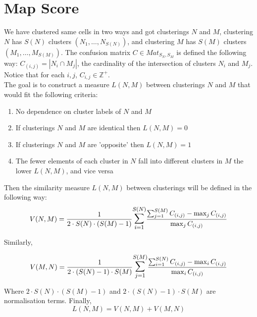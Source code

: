 \documentclass{article}
\begin{document}
\section{Map Score}
We have clustered same cells in two ways and got clusterings $N$ and $M$, clustering $N$ has $S(N)$ clusters $(N_1, \ldots, N_{S(N)})$, and clustering $M$ has $S(M)$ clusters $(M_1,\ldots,M_{S(M)})$. The confusion matrix $C\in Mat_{S_N,S_M}$ is defined the following way: $C_{(i,j)} = |N_i \cap M_j|$, the cardinality of the intersection of clusters $N_i$ and $M_j$. Notice that for each $i,j$, $C_{i,j} \in \mathbb{Z^+}$.\\

The goal is to construct a measure $L(N,M)$ between clusterings $N$ and $M$ that would fit the following criteria: 
\begin{enumerate}
    \item No dependence on cluster labels of $N$ and $M$
    \item If clusterings $N$ and $M$ are identical then $L(N,M) = 0$
    \item If clusterings $N$ and $M$ are 'opposite' then $L(N,M) = 1$
    \item The fewer elements of each cluster in $N$ fall into different clusters in $M$ the lower $L(N,M)$, and vice versa
\end{enumerate}

Then the  similarity measure $L(N,M)$ between clusterings will be defined in the following way: 
\[
V(N,M)= \frac{1}{2 \cdot S(N)\cdot (S(M)-1)} \mathlarger{\mathlarger{\sum}}_{i = 1}^{S(N)} \frac{ \sum_{j=1}^{S(M)} C_{(i,j)} - \max_j C_{(i, j)} }{  \max_j C_{(i, j)} }
\]

Similarly,

\[
V(M,N) = \frac{1}{2 \cdot (S(N)-1)\cdot S(M)} \mathlarger{\mathlarger{\sum}}_{j=1}^{S(M)} \frac{ \sum_{i=1}^{S(N)} C_{(i,j)} - \max_i C_{(i,j)} }{ \max_i C_{(i,j)} }
\]

Where $2 \cdot S(N) \cdot (S(M)-1)$ and $2 \cdot (S(N)-1)\cdot S(M)$ are normalisation terms. Finally, 
$$
L(N,M) = V(N,M) + V(M,N)
$$
\end{document}
